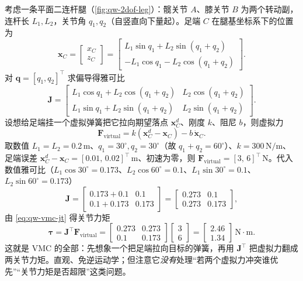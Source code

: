 \begin{example}\label{exam:qw-vmc-2dof}
考虑一条平面二连杆腿（\cref{fig:qw-2dof-leg}）：髋关节 $A$、膝关节 $B$ 为两个转动副，连杆长 $L_1,L_2$，关节角 $q_1,q_2$（自竖直向下量起）。足端 $C$ 在腿基坐标系下的位置为
\[
  \boldsymbol{x}_C=\begin{bmatrix}x_C\\ z_C\end{bmatrix}
  =\begin{bmatrix} L_1\sin q_1+L_2\sin(q_1+q_2)\\ -L_1\cos q_1-L_2\cos(q_1+q_2)\end{bmatrix}.
\]
对 $\boldsymbol{q}=[q_1,q_2]^\top$ 求偏导得雅可比
\[
  \boldsymbol{J}=\begin{bmatrix}
  L_1\cos q_1+L_2\cos(q_1+q_2) & L_2\cos(q_1+q_2)\\
  L_1\sin q_1+L_2\sin(q_1+q_2) & L_2\sin(q_1+q_2)
  \end{bmatrix}.
\]
设想给足端挂一个虚拟弹簧把它拉向期望落点 $\boldsymbol{x}_C^d$、刚度 $k$、阻尼 $b$，则虚拟力
\[
  \boldsymbol{F}_{\mathrm{virtual}}=k(\boldsymbol{x}_C^d-\boldsymbol{x}_C)-b\,\dot{\boldsymbol{x}}_C.
\]
取数值 $L_1=L_2=0.2\,\mathrm{m}$、$q_1=30^\circ,q_2=30^\circ$（故 $q_1+q_2=60^\circ$）、$k=300\,\mathrm{N/m}$、足端误差 $\boldsymbol{x}_C^d-\boldsymbol{x}_C=[0.01,\,0.02]^\top\,\mathrm{m}$、初速为零，则 $\boldsymbol{F}_{\mathrm{virtual}}=[3,\,6]^\top\,\mathrm{N}$。代入数值雅可比（$L_1\cos30^\circ=0.173$、$L_2\cos60^\circ=0.1$、$L_1\sin30^\circ=0.1$、$L_2\sin60^\circ=0.173$）
\[
  \boldsymbol{J}=\begin{bmatrix}0.173+0.1 & 0.1\\ 0.1+0.173 & 0.173\end{bmatrix}
  =\begin{bmatrix}0.273 & 0.1\\ 0.273 & 0.173\end{bmatrix},
\]
由 \cref{eq:qw-vmc-jt} 得关节力矩
\[
  \boldsymbol{\tau}=\boldsymbol{J}^\top\boldsymbol{F}_{\mathrm{virtual}}
  =\begin{bmatrix}0.273 & 0.273\\ 0.1 & 0.173\end{bmatrix}\begin{bmatrix}3\\6\end{bmatrix}
  =\begin{bmatrix}2.46\\ 1.34\end{bmatrix}\,\mathrm{N\cdot m}.
\]
这就是 VMC 的全部：先想象一个把足端拉向目标的弹簧，再用 $\boldsymbol{J}^\top$ 把虚拟力翻成两关节力矩。直观、免逆运动学；但注意它\emph{没有}处理“若两个虚拟力冲突谁优先”“关节力矩是否超限”这类问题。
\end{example}

